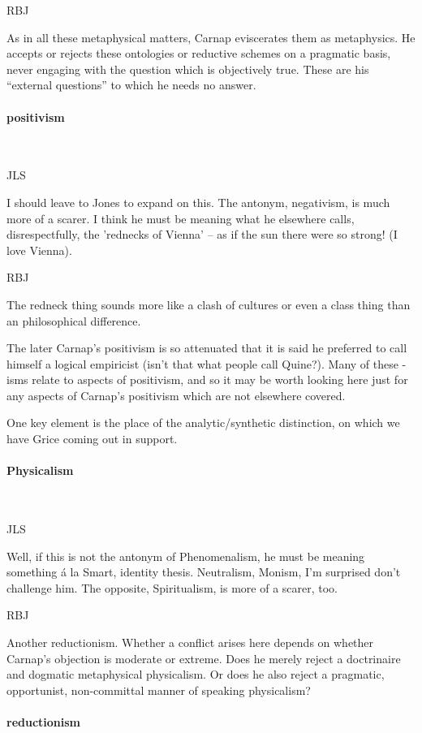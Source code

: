 \documentclass[10pt,titlepage]{book}
\begin{document}
RBJ

As in all these metaphysical matters, Carnap eviscerates them as metaphysics.
He accepts or rejects these ontologies or reductive schemes on a pragmatic basis, never engaging with the question which is objectively true.
These are his ``external questions'' to which he needs no answer.

\paragraph{positivism}\ 

JLS

I should leave to Jones to expand on this. The antonym,  
negativism, is much more of a scarer. I think he must be meaning what he  
elsewhere calls, disrespectfully, the 'rednecks of Vienna' -- as if the sun  there 
were so strong! (I love Vienna).

RBJ

The redneck thing sounds more like a clash of cultures or even a class thing than an philosophical difference.

The later Carnap's positivism is so attenuated that it is said he preferred to call himself a logical empiricist (isn't that what people call Quine?).
Many of these -isms relate to aspects of positivism, and so it may be worth looking here just for any aspects of Carnap's positivism which are not elsewhere covered.

One key element is the place of the analytic/synthetic distinction, on which we have Grice coming out in support.
 
\paragraph{Physicalism}\ 

JLS

Well, if this is not the antonym of Phenomenalism, he must be  
meaning something \'a la Smart, identity thesis. Neutralism, Monism, I'm 
surprised  don't challenge him. The opposite, Spiritualism, is more of a scarer, 
too.

RBJ

Another reductionism.
Whether a conflict arises here depends on whether Carnap's objection is moderate or extreme.
Does he merely reject a doctrinaire and dogmatic metaphysical physicalism.
Or does he also reject a pragmatic, opportunist, non-committal manner of speaking physicalism?

\paragraph{reductionism}\ 
\end{document}
